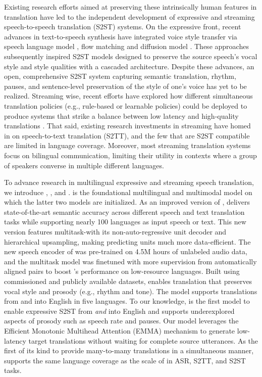 \documentclass[twoside,11pt]{fairmeta_seamless}
\begin{document}
Existing research efforts aimed at preserving these intrinsically human features in translation have led to the independent development of expressive and streaming speech-to-speech translation (S2ST) systems. On the expressive front, recent advances in text-to-speech synthesis have integrated voice style transfer via speech language model \citep{valle,pgslm}, flow matching \citep{le2023voicebox} and diffusion model \citep{Shen2023NaturalSpeech2L}. These approaches subsequently inspired S2ST models designed to preserve the source speech's vocal style and style qualities with a cascaded architecture. 
Despite these advances, an open, comprehensive S2ST system capturing semantic translation, rhythm, pauses, and sentence-level preservation of the style of one's voice has yet to be realized.
Streaming wise, recent efforts have explored how different simultaneous translation policies (e.g., rule-based or learnable policies) could be deployed to produce systems that strike a balance between low latency and high-quality translations \citep{ma_stacl_2019,arivazhagan_monotonic_2019,ma_monotonic_2019}.
That said, existing research investments in streaming have homed in on speech-to-text translation (S2TT), and the few that are S2ST compatible are limited in language coverage.
Moreover, most streaming translation systems focus on bilingual communication, limiting their utility in contexts where a group of speakers converse in multiple different languages.

To advance research in multilingual expressive and streaming speech translation, we introduce \textbf{\mfourttwo}, \textbf{\expressive}, and \textbf{\streaming}. 
\mfourttwo is the foundational multilingual and multimodal model on which the latter two models are initialized. 
As an improved version of \mfourt, \mfourttwo delivers state-of-the-art semantic accuracy across different speech and text translation tasks while supporting nearly 100 languages as input speech or text. This new version features multitask-\unitytwo with its non-auto-regressive unit decoder and hierarchical upsampling, making predicting units much more data-efficient. The new \wvbert speech encoder of \mfourttwo was pre-trained on 4.5M hours of unlabeled audio data, and the multitask model was finetuned with more supervision from automatically aligned pairs
to boost \mfourttwo's performance on low-resource languages.
Built using commissioned and publicly available datasets, \expressive enables translation that preserves vocal style and prosody (e.g., rhythm and tone). The model supports translations from and into English in five languages. 
To our knowledge, 
\expressive is the first model to enable expressive S2ST from \textit{and} into English and supports underexplored aspects of prosody such as speech rate and pauses. 
Our \streaming model leverages the Efficient Monotonic Multihead Attention (EMMA) \citep{ma_efficient_2023} mechanism to generate low-latency target translations without waiting for complete source utterances. As the first of its kind to provide many-to-many translations in a simultaneous manner, \streaming supports the same language coverage as the scale of \mfourttwo in ASR, S2TT, and S2ST tasks.
\end{document}
